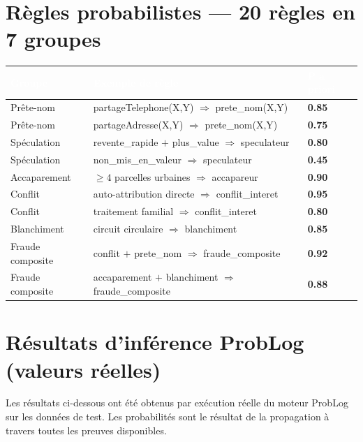 \documentclass[11pt,a4paper]{report}
\begin{document}
\section{Règles probabilistes — 20 règles en 7 groupes}

\begin{longtable}{p{3.5cm} p{8cm} >{\bfseries}p{2cm}}
\toprule
\rowcolor{tablehead}\textcolor{white}{Groupe} & \textcolor{white}{Exemple de règle} & \textcolor{white}{P a priori} \\
\midrule
\endhead
Prête-nom         & partageTelephone(X,Y) $\Rightarrow$ prete\_nom(X,Y) & 0.85 \\
Prête-nom         & partageAdresse(X,Y) $\Rightarrow$ prete\_nom(X,Y)   & 0.75 \\
Spéculation       & revente\_rapide $+$ plus\_value $\Rightarrow$ speculateur & 0.80 \\
Spéculation       & non\_mis\_en\_valeur $\Rightarrow$ speculateur & 0.45 \\
Accaparement      & $\geq 4$ parcelles urbaines $\Rightarrow$ accapareur & 0.90 \\
Conflit           & auto-attribution directe $\Rightarrow$ conflit\_interet & 0.95 \\
Conflit           & traitement familial $\Rightarrow$ conflit\_interet & 0.80 \\
Blanchiment       & circuit circulaire $\Rightarrow$ blanchiment & 0.85 \\
Fraude composite  & conflit $+$ prete\_nom $\Rightarrow$ fraude\_composite & 0.92 \\
Fraude composite  & accaparement $+$ blanchiment $\Rightarrow$ fraude\_composite & 0.88 \\
\bottomrule
\end{longtable}

\section{Résultats d'inférence ProbLog (valeurs réelles)}

Les résultats ci-dessous ont été obtenus par exécution réelle du moteur ProbLog
sur les données de test. Les probabilités sont le résultat de la propagation à
travers toutes les preuves disponibles.
\end{document}
